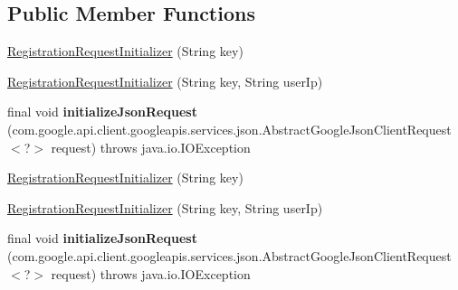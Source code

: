 \subsection*{Public Member Functions}
\begin{DoxyCompactItemize}
\item 
\hyperlink{classcom_1_1example_1_1lusifer_1_1myapplication_1_1backend_1_1registration_1_1_registration_request_initializer_a1fcebc896e0a138510799819494d353e}{Registration\+Request\+Initializer} (String key)
\item 
\hyperlink{classcom_1_1example_1_1lusifer_1_1myapplication_1_1backend_1_1registration_1_1_registration_request_initializer_a24ca4cae7e5581f1a2d6639b54c8a42b}{Registration\+Request\+Initializer} (String key, String user\+Ip)
\item 
\hypertarget{classcom_1_1example_1_1lusifer_1_1myapplication_1_1backend_1_1registration_1_1_registration_request_initializer_a22a6c967fb61fe4e65b41466ef601b9e}{}final void {\bfseries initialize\+Json\+Request} (com.\+google.\+api.\+client.\+googleapis.\+services.\+json.\+Abstract\+Google\+Json\+Client\+Request$<$?$>$ request)  throws java.\+io.\+I\+O\+Exception \label{classcom_1_1example_1_1lusifer_1_1myapplication_1_1backend_1_1registration_1_1_registration_request_initializer_a22a6c967fb61fe4e65b41466ef601b9e}

\item 
\hyperlink{classcom_1_1example_1_1lusifer_1_1myapplication_1_1backend_1_1registration_1_1_registration_request_initializer_a1fcebc896e0a138510799819494d353e}{Registration\+Request\+Initializer} (String key)
\item 
\hyperlink{classcom_1_1example_1_1lusifer_1_1myapplication_1_1backend_1_1registration_1_1_registration_request_initializer_a24ca4cae7e5581f1a2d6639b54c8a42b}{Registration\+Request\+Initializer} (String key, String user\+Ip)
\item 
\hypertarget{classcom_1_1example_1_1lusifer_1_1myapplication_1_1backend_1_1registration_1_1_registration_request_initializer_a22a6c967fb61fe4e65b41466ef601b9e}{}final void {\bfseries initialize\+Json\+Request} (com.\+google.\+api.\+client.\+googleapis.\+services.\+json.\+Abstract\+Google\+Json\+Client\+Request$<$?$>$ request)  throws java.\+io.\+I\+O\+Exception \label{classcom_1_1example_1_1lusifer_1_1myapplication_1_1backend_1_1registration_1_1_registration_request_initializer_a22a6c967fb61fe4e65b41466ef601b9e}

\end{DoxyCompactItemize}
